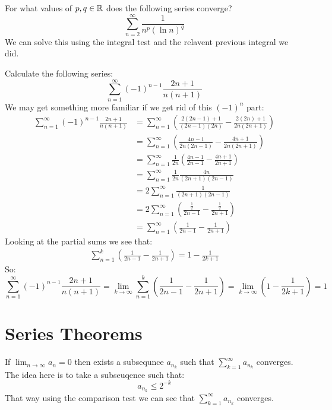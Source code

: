 \documentclass[11pt,a4paper]{article}
\begin{document}
	\newpage
	
	For what values of $p,q\in\mathbb{R}$ does the following series 
	converge?
	\[
		\sum_{n=2}^{\infty}{\frac{1}{n^p(\ln n)^q}}
	\]
	We can solve this using the integral test and the relavent previous
	integral we did.
	
	\newpage
	
	Calculate the following series:
	\[
	\sum_{n=1}^{\infty}{(-1)^{n-1}\frac{2n+1}{n(n+1)}}
	\]
	We may get something more familiar if we get rid of this $(-1)^n$ part:
	\begin{align*}
		\sum_{n=1}^{\infty}{(-1)^{n-1}\frac{2n+1}{n(n+1)}} &= 
		\sum_{n=1}^{\infty}{\left(\frac{2(2n-1)+1}{(2n-1)(2n)} - 
		\frac{2(2n)+1}{2n(2n+1)}\right)} \\ &=
		\sum_{n=1}^{\infty}{\left(\frac{4n-1}{2n(2n-1)} - 
		\frac{4n+1}{2n(2n+1)}\right)} \\ &=
		\sum_{n=1}^{\infty}{\frac{1}{2n}\left(\frac{4n-1}{2n-1} - 
		\frac{4n+1}{2n+1}\right)} \\ &=
		\sum_{n=1}^{\infty}{\frac{1}{2n}\frac{4n}{(2n+1)(2n-1)}} \\ &=
		2\sum_{n=1}^{\infty}{\frac{1}{(2n+1)(2n-1)}} \\ &=
		2\sum_{n=1}^{\infty}
		{\left(\frac{\frac{1}{2}}{2n-1} - \frac{\frac{1}{2}}{2n+1}\right)} 
		\\ &=
		\sum_{n=1}^{\infty}{\left(\frac{1}{2n-1} - \frac{1}{2n+1}\right)}
	\end{align*}
	Looking at the partial sums we see that:
	\begin{align*}
		\sum_{n=1}^{k}{\left(\frac{1}{2n-1} - \frac{1}{2n+1}\right)} =
		1 - \frac{1}{2k+1}
	\end{align*}
	So:
	\[
		\sum_{n=1}^{\infty}{(-1)^{n-1}\frac{2n+1}{n(n+1)}} = 
		\lim_{k\to\infty}
		{\sum_{n=1}^{k}{\left(\frac{1}{2n-1} - \frac{1}{2n+1}\right)}} = 
		\lim_{k\to\infty}{\left(1 - \frac{1}{2k+1}\right)} = 1
	\]
	
	\newpage
	
	\section{Series Theorems}
	If $\lim_{n\to\infty}{a_n} = 0$ then exists a subsequnce
	$a_{n_k}$ such that $\sum_{k=1}^{\infty}{a_{n_k}}$ converges.
	The idea here is to take a subseuqence such that:
	\[
		a_{n_k} \le 2^{-k}
	\]
	That way using the comparison test we can see that 
	$\sum_{k=1}^{\infty}{a_{n_k}}$ converges.
	
	\newpage
	
\end{document}
